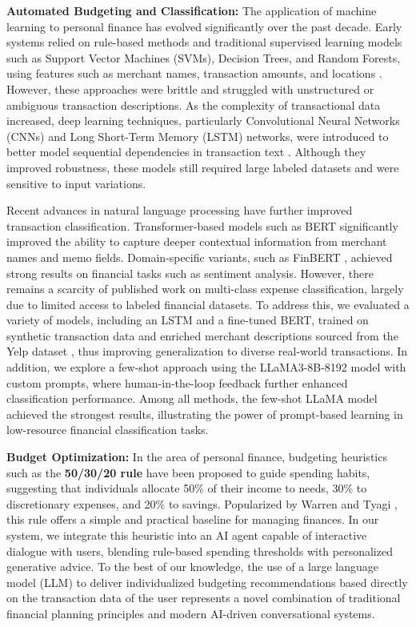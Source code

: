 \documentclass[conference]{IEEEtran}
\begin{document}
\textbf{Automated Budgeting and Classification:}  
The application of machine learning to personal finance has evolved significantly over the past decade. Early systems relied on rule-based methods and traditional supervised learning models such as Support Vector Machines (SVMs), Decision Trees, and Random Forests, using features such as merchant names, transaction amounts, and locations \cite{hossain2019}. However, these approaches were brittle and struggled with unstructured or ambiguous transaction descriptions. As the complexity of transactional data increased, deep learning techniques, particularly Convolutional Neural Networks (CNNs) and Long Short-Term Memory (LSTM) networks, were introduced to better model sequential dependencies in transaction text \cite{DL}. Although they improved robustness, these models still required large labeled datasets and were sensitive to input variations.

Recent advances in natural language processing have further improved transaction classification. Transformer-based models such as BERT \cite{b6} significantly improved the ability to capture deeper contextual information from merchant names and memo fields. Domain-specific variants, such as FinBERT \cite{finbert2020}, achieved strong results on financial tasks such as sentiment analysis. However, there remains a scarcity of published work on multi-class expense classification, largely due to limited access to labeled financial datasets. To address this, we evaluated a variety of models, including an LSTM and a fine-tuned BERT, trained on synthetic transaction data and enriched merchant descriptions sourced from the Yelp dataset \cite{yelpdata2023}, thus improving generalization to diverse real-world transactions. In addition, we explore a few-shot approach using the LLaMA3-8B-8192 model with custom prompts, where human-in-the-loop feedback further enhanced classification performance. Among all methods, the few-shot LLaMA model achieved the strongest results, illustrating the power of prompt-based learning in low-resource financial classification tasks.

\textbf{Budget Optimization:}  
In the area of personal finance, budgeting heuristics such as the \textbf{50/30/20 rule} \cite{b8} have been proposed to guide spending habits, suggesting that individuals allocate 50\% of their income to needs, 30\% to discretionary expenses, and 20\% to savings. Popularized by Warren and Tyagi \cite{b8}, this rule offers a simple and practical baseline for managing finances. In our system, we integrate this heuristic into an AI agent capable of interactive dialogue with users, blending rule-based spending thresholds with personalized generative advice. To the best of our knowledge, the use of a large language model (LLM) to deliver individualized budgeting recommendations based directly on the transaction data of the user represents a novel combination of traditional financial planning principles and modern AI-driven conversational systems.
\end{document}
